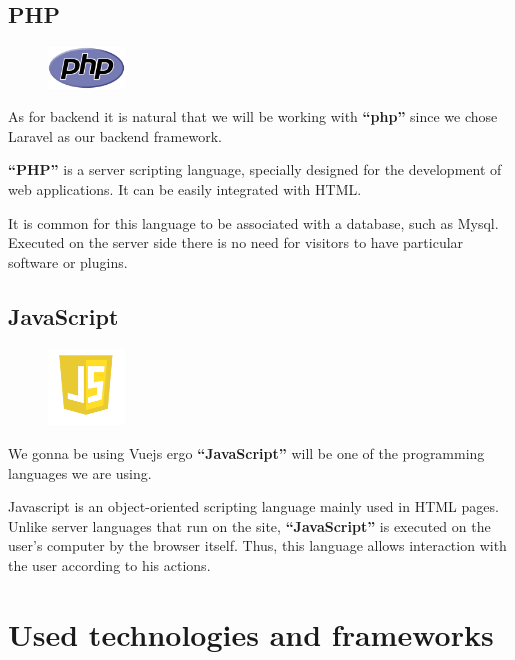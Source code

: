 \documentclass[12pt,a4paper]{report}
\begin{document}
	\subsection{PHP}
	\begin{figure}
		\centering
		\includegraphics[width=0.8in]{PHP-logo.png}	
	\end{figure}
	As for backend it is natural that we will be working with \textbf{``\ac{php}''} since we chose Laravel as our backend framework. \cite{phpbook}\par 
	\textbf{``PHP''} is a server scripting language, specially designed for the development of web applications. It can be easily integrated with HTML. \par 
	It is common for this language to be associated with a database, such as My\ac{sql}. Executed on the server side there is no need for visitors to have particular software or plugins.
	\subsection{JavaScript}
	\begin{figure}
		\centering
		\includegraphics[width=0.8in]{JavaScript-logo.png}	
	\end{figure}
	We gonna be using Vuejs ergo \textbf{``JavaScript''} will be one of the programming languages we are using.\par 
	Javascript is an object-oriented scripting language mainly used in HTML pages. Unlike server languages that run on the site, \textbf{``JavaScript''} is executed on the user's computer by the browser itself. Thus, this language allows interaction with the user according to his actions.
	\section{Used technologies and frameworks}
	
\end{document}
